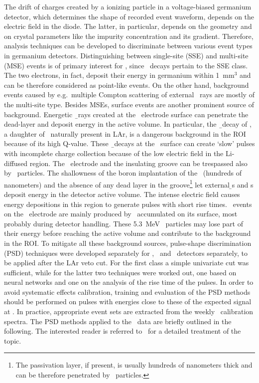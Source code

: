 The drift of charges created by a ionizing particle in a voltage-biased germanium
detector, which determines the shape of recorded event waveform, depends on the electric
field in the diode. The latter, in particular, depends on the geometry and on crystal
parameters like the impurity concentration and its gradient. Therefore, analysis
techniques can be developed to discriminate between various event types in germanium
detectors. Distinguishing between single-site (SSE) and multi-site (MSE) events is of
primary interest for \gerda, since \onbb\ decays pertain to the SSE class. The two
electrons, in fact, deposit their energy in germanium within 1~mm$^3$ and can be therefore
considered as point-like events. On the other hand, background events caused by
e.g.~multiple Compton scattering of external \g\ rays are mostly of the multi-site type.
Besides MSEs, surface events are another prominent source of background. Energetic \b\
rays created at the \nplus\ electrode surface can penetrate the dead-layer and deposit
energy in the active volume. In particular, the \b\ decay of \kvz, a daughter of \Arh\
naturally present in LAr, is a dangerous background in the ROI because of its high
Q-value. These \b\ decays at the \nplus\ surface can create `slow' pulses with incomplete
charge collection because of the low electric field in the Li-diffused region. The \pplus\
electrode and the insulating groove can be trespassed also by \a\ particles. The
shallowness of the boron implantation of the \pplus\ (hundreds of nanometers) and the
absence of any dead layer in the groove\footnote{The passivation layer, if present, is
usually hundreds of nanometers thick and can be therefore penetrated by \a\ particles.}
let external \b{}s and \a{}s deposit energy in the detector active volume. The intense
electric field causes energy depositions in this region to generate pulses with short
rise times. \a\ events on the \pplus\ electrode are mainly produced by \Po\ accumulated
on its surface, most probably during detector handling. These 5.3~MeV \a\ particles may
lose part of their energy before reaching the active volume and contribute to the
background in the ROI.
\newpar
To mitigate all these background sources, pulse-shape discrimination (PSD) techniques were
developed separately for \bege, \icoax\ and \scoax\ detectors separately, to be applied
after the LAr veto cut. For the first class a simple univariate cut was sufficient, while
for the latter two techniques were worked out, one based on neural networks and one on the
analysis of the rise time of the pulses.  In order to avoid systematic effects
calibration, training and evaluation of the PSD methods should be performed on pulses with
energies close to these of the expected signal at \qbb.  In practice, appropriate event
sets are extracted from the weekly \Th\ calibration spectra. The PSD methods applied to
the \gerda\ data are briefly outlined in the following. The interested reader is referred
to~\cite{psd-paper} for a detailed treatment of the topic. \fillme{define somewhere FEP,
SEP and DEP}

